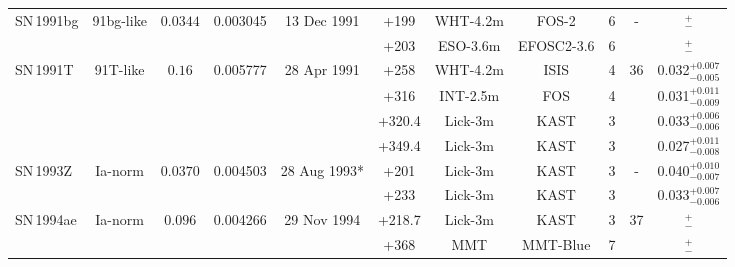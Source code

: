 \documentclass[fleqn,usenatbib]{mnras}
\begin{document}
\begin{table}
{\begin{tabular}{l c c cccccccc}
    SN\,1991bg & 91bg-like & $0.0344$ & 0.003045 & 13 Dec 1991  & +199   & WHT-4.2m & FOS-2           & 6 &-& $^{+}_{-}$ \\
             &           &          &          &              & +203   & ESO-3.6m & EFOSC2-3.6      & 6 & & $^{+}_{-}$ \\
    SN\,1991T  & 91T-like  & $0.16$   & 0.005777 & 28 Apr 1991  & +258   & WHT-4.2m & ISIS            & 4 & 36& 0.032$^{+0.007}_{-0.005}$ \\
             &           &          &          &              & +316   & INT-2.5m & FOS             & 4 & & 0.031$^{+0.011}_{-0.009}$ \\
             &           &          &          &              & +320.4 & Lick-3m & KAST             & 3 & & 0.033$^{+0.006}_{-0.006}$ \\
             &           &          &          &              & +349.4 & Lick-3m & KAST             & 3 & & 0.027$^{+0.011}_{-0.008}$ \\
    SN\,1993Z  & Ia-norm   & $0.0370$ & 0.004503 & 28 Aug 1993* & +201   & Lick-3m & KAST             & 3 &-& 0.040$^{+0.010}_{-0.007}$ \\
             &           &          &          &              & +233   & Lick-3m & KAST             & 3 & & 0.033$^{+0.007}_{-0.006}$ \\
    SN\,1994ae & Ia-norm   & $0.096$  & 0.004266 & 29 Nov 1994  & +218.7 & Lick-3m & KAST             & 3 &37& $^{+}_{-}$ \\
             &           &          &          &              & +368   & MMT & MMT-Blue             & 7 & & $^{+}_{-}$ \\

\end{tabular}}
\end{table}
\end{document}
